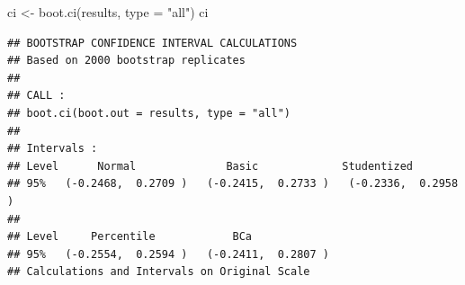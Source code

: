 \documentclass[12pt]{article}
\newenvironment{Shaded}{\begin{snugshade}}{\end{snugshade}}
\newcommand{\AttributeTok}[1]{\textcolor[rgb]{0.77,0.63,0.00}{#1}}
\newcommand{\FunctionTok}[1]{\textcolor[rgb]{0.00,0.00,0.00}{#1}}
\newcommand{\NormalTok}[1]{#1}
\newcommand{\OtherTok}[1]{\textcolor[rgb]{0.56,0.35,0.01}{#1}}
\newcommand{\StringTok}[1]{\textcolor[rgb]{0.31,0.60,0.02}{#1}}
\begin{document}
\begin{Shaded}
\begin{Highlighting}[]
\NormalTok{ci }\OtherTok{\textless{}{-}} \FunctionTok{boot.ci}\NormalTok{(results, }\AttributeTok{type =} \StringTok{"all"}\NormalTok{)}
\NormalTok{ci}
\end{Highlighting}
\end{Shaded}

\begin{verbatim}
## BOOTSTRAP CONFIDENCE INTERVAL CALCULATIONS
## Based on 2000 bootstrap replicates
## 
## CALL : 
## boot.ci(boot.out = results, type = "all")
## 
## Intervals : 
## Level      Normal              Basic             Studentized     
## 95%   (-0.2468,  0.2709 )   (-0.2415,  0.2733 )   (-0.2336,  0.2958 )  
## 
## Level     Percentile            BCa          
## 95%   (-0.2554,  0.2594 )   (-0.2411,  0.2807 )  
## Calculations and Intervals on Original Scale
\end{verbatim}



\end{document}
